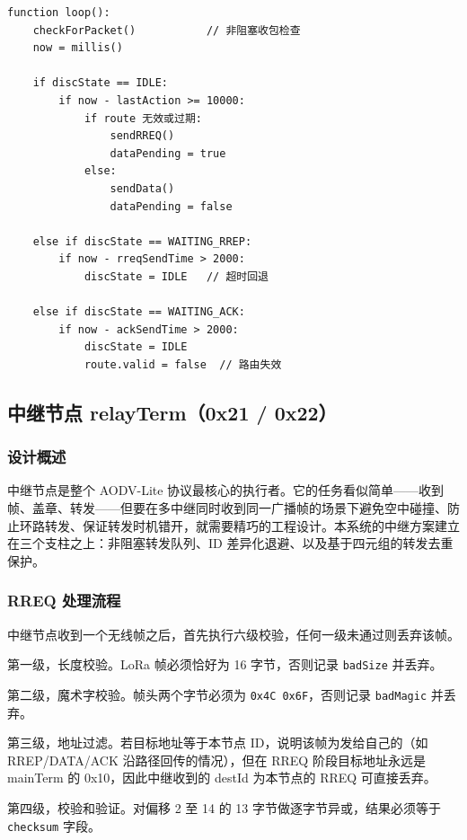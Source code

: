 \documentclass[12pt,a4paper]{ctexart}
\begin{document}
\begin{lstlisting}[]
function loop():
    checkForPacket()           // 非阻塞收包检查
    now = millis()

    if discState == IDLE:
        if now - lastAction >= 10000:
            if route 无效或过期:
                sendRREQ()
                dataPending = true
            else:
                sendData()
                dataPending = false

    else if discState == WAITING_RREP:
        if now - rreqSendTime > 2000:
            discState = IDLE   // 超时回退

    else if discState == WAITING_ACK:
        if now - ackSendTime > 2000:
            discState = IDLE
            route.valid = false  // 路由失效
\end{lstlisting}

\subsection{中继节点 relayTerm（0x21 / 0x22）}

\subsubsection{设计概述}

中继节点是整个 AODV-Lite 协议最核心的执行者。它的任务看似简单——收到帧、盖章、转发——但要在多中继同时收到同一广播帧的场景下避免空中碰撞、防止环路转发、保证转发时机错开，就需要精巧的工程设计。本系统的中继方案建立在三个支柱之上：非阻塞转发队列、ID 差异化退避、以及基于四元组的转发去重保护。

\subsubsection{RREQ 处理流程}

中继节点收到一个无线帧之后，首先执行六级校验，任何一级未通过则丢弃该帧。

第一级，长度校验。LoRa 帧必须恰好为 16 字节，否则记录 \texttt{badSize} 并丢弃。

第二级，魔术字校验。帧头两个字节必须为 \texttt{0x4C 0x6F}，否则记录 \texttt{badMagic} 并丢弃。

第三级，地址过滤。若目标地址等于本节点 ID，说明该帧为发给自己的（如 RREP/DATA/ACK 沿路径回传的情况），但在 RREQ 阶段目标地址永远是 mainTerm 的 0x10，因此中继收到的 destId 为本节点的 RREQ 可直接丢弃。

第四级，校验和验证。对偏移 2 至 14 的 13 字节做逐字节异或，结果必须等于 \texttt{checksum} 字段。
\end{document}
